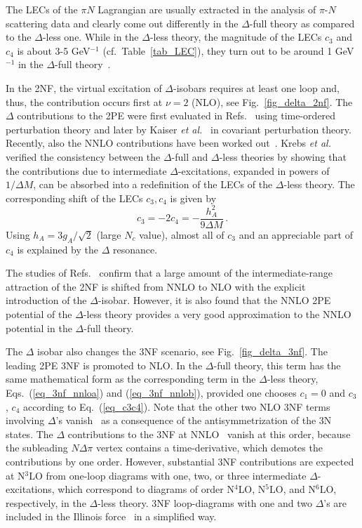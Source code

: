 \documentclass[sort&compress,preprint,3p]{elsarticle}
\begin{document}
The LECs of the $\pi N$ Lagrangian are usually extracted in the analysis of $\pi$-$N$
scattering data and clearly come out differently in the $\Delta$-full theory as compared
to the $\Delta$-less one. While in the $\Delta$-less theory, the magnitude of the LECs
$c_3$ and $c_4$ is about 3-5 GeV$^{-1}$ (cf.\ Table~\ref{tab_LEC}),
they turn out to be around 1 GeV$^{-1}$ in the $\Delta$-full theory~\cite{KEM07}.



In the 2NF, the virtual excitation of $\Delta$-isobars requires at least one loop and, thus,
the contribution occurs first at $\nu=2$ (NLO), see Fig.~\ref{fig_delta_2nf}.
The $\Delta$ contributions to the 2PE were first evaluated in Refs.~\cite{OK92,ORK94,ORK96}
using time-ordered perturbation theory and later by Kaiser {\it et al.}~\cite{KGW98} in
covariant perturbation theory. Recently, also the NNLO contributions have been worked out~\cite{KEM07}.
Krebs {\it et al.}~\cite{KEM07} verified  the consistency between the $\Delta$-full and $\Delta$-less 
theories by showing that the contributions due to intermediate $\Delta$-excitations, expanded in 
powers of $1/\Delta M$, can be absorbed into a redefinition of the LECs of the $\Delta$-less
theory. The corresponding shift of the LECs $c_3,c_4$ is given by
\begin{equation}
c_3=-2c_4=-\frac{h_A^2}{9\Delta M}
\,.
\label{eq_c3c4}
\end{equation}
Using $h_A=3g_A/\sqrt{2}$ (large $N_c$ value), almost all of $c_3$
and an appreciable part of $c_4$ is explained by the $\Delta$ resonance.

The studies of Refs.~\cite{KGW98,KEM07} confirm that
a large amount of the intermediate-range attraction of the 2NF is shifted from NNLO to NLO
with the explicit introduction of the $\Delta$-isobar. 
However, it is also found that
the NNLO 2PE potential of the $\Delta$-less theory
provides a very good approximation to the NNLO potential in the $\Delta$-full theory.

The $\Delta$ isobar also changes the 3NF scenario, see Fig.~\ref{fig_delta_3nf}. 
The leading 2PE 3NF is promoted to NLO. In the $\Delta$-full theory, this term has
the same mathematical form as the corresponding term in the $\Delta$-less theory,
Eqs.~(\ref{eq_3nf_nnloa}) and (\ref{eq_3nf_nnlob}), provided one chooses $c_1=0$
and $c_3$, $c_4$ according to Eq.~(\ref{eq_c3c4}).
Note that the other two NLO 3NF terms involving $\Delta$'s vanish~\cite{EKM08}
as a consequence of the antisymmetrization of the 3N states.
The $\Delta$ contributions to the 3NF at NNLO~\cite{EKM08} vanish at this order,
because the subleading $N\Delta \pi$ vertex contains a time-derivative, which demotes
the contributions by one order. 
However, substantial 3NF contributions are expected at N$^3$LO from one-loop
diagrams with one, two, or three
intermediate $\Delta$-excitations,
which correspond to diagrams of order N$^4$LO, N$^5$LO, and N$^6$LO, respectively, 
in the $\Delta$-less theory. 
3NF loop-diagrams with one and two $\Delta$'s 
are included in the Illinois force~\cite{Pie01}
in a simplified way.
\end{document}

